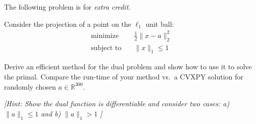 \documentclass[11pt,letter,notitlepage]{article}
\theoremstyle{definition}
\begin{document}
\newpage
\begin{exercise}
The following problem is for \textit{extra credit}.

Consider the projection of a point on the $\ell_1$ unit ball:
\[
\begin{aligned}
    \text{minimize} \quad & \frac{1}{2}\|x-a\|_2^2 \\
    \text{subject to} \quad & \|x\|_1 \le 1
\end{aligned}
\]

Derive an efficient method for the dual problem and show how to use it to solve the primal. Compare the run-time of your method vs.\ a CVXPY solution for randomly chosen $a\in\mathbb{R}^{300}$.

\textit{[Hint: Show the dual function is differentiable and consider two cases: a) } $\|a\|_1 \le 1$ \textit{ and b) } $\|a\|_1 > 1$ \textit{]}
\end{exercise}

\newpage
\end{document}
